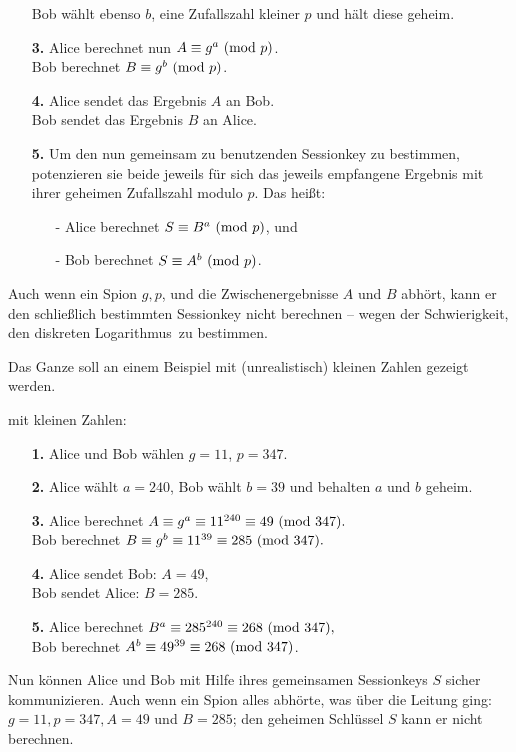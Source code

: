 \begin{refsegment}
\begin{itemize}
                 Bob wählt ebenso $b$, eine Zufallszahl kleiner $p$ und
                 hält diese geheim.
   \item[\textbf{3.}] Alice berechnet nun $A \equiv g^a {\rm ~(mod~} p)$.\\
                 Bob berechnet $B \equiv g^b {\rm ~(mod~} p)$.
   \item[\textbf{4.}] Alice sendet das Ergebnis $A$ an Bob.\\
                 Bob sendet das Ergebnis $B$ an Alice.
   \item[\textbf{5.}] Um den nun gemeinsam zu benutzenden Sessionkey zu bestimmen,
                 potenzieren sie beide jeweils für sich das jeweils empfangene
                 Ergebnis mit ihrer geheimen Zufallszahl modulo $p$. Das heißt:
         \begin{itemize}
                    \item[-] Alice berechnet $S \equiv B^a {\rm ~(mod~} p)$, und
                    \item[-] Bob berechnet   $S \equiv A^b {\rm ~(mod~} p)$.
         \end{itemize}
\end{itemize}
Auch wenn ein Spion $g, p$, und die Zwischenergebnisse $A$ und $B$ abhört, kann
er den schließlich bestimmten Sessionkey nicht berechnen -- wegen der
Schwierigkeit, den diskreten Logarithmus\footnotemark~zu bestimmen.

 Das Ganze soll an einem Beispiel mit (unrealistisch) kleinen Zahlen gezeigt
werden.

\begin{example}{ mit kleinen Zahlen:}
\begin{itemize}
   \item[\textbf{1.}] Alice und Bob wählen $g = 11$, $p = 347$.
   \item[\textbf{2.}] Alice wählt $a = 240$, Bob wählt $b = 39$ und behalten $a$ und $b$ geheim.
   \item[\textbf{3.}] Alice berechnet $A \equiv g^a \equiv 11^{240} \equiv 49 {\rm ~(mod~} 347).$\\
                 Bob berechnet $B \equiv g^b \equiv 11^{39} \equiv 285 {\rm ~(mod~} 347).$
   \item[\textbf{4.}] Alice sendet Bob: $A = 49$,\\
                 Bob sendet Alice: $B = 285$.
   \item[\textbf{5.}] Alice berechnet $B^a \equiv 285^{240} \equiv 268 {\rm ~(mod~}347),$\\
                 Bob berechnet $A^b \equiv 49^{39} \equiv 268 {\rm ~(mod~}347)$.
\end{itemize}
Nun können Alice und Bob mit Hilfe ihres gemeinsamen Sessionkeys $S$ sicher
kommunizieren. Auch wenn ein Spion alles abhörte, was über die Leitung ging:
$g = 11, p = 347, A = 49$ und $B = 285$; den geheimen Schlüssel $S$ kann er nicht
berechnen.


\end{example}
\end{refsegment}
